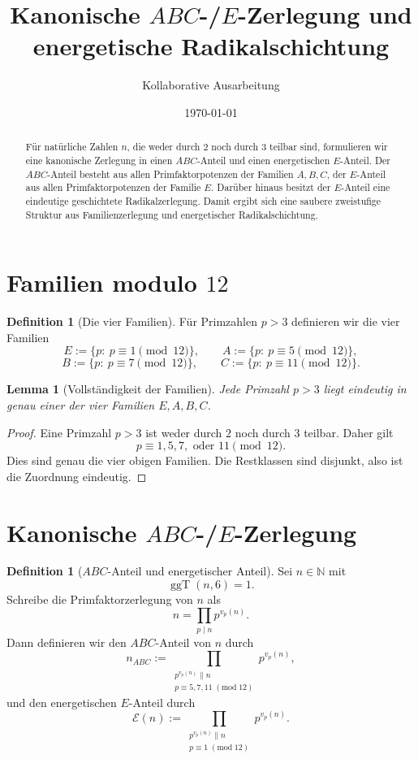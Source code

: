 \documentclass[11pt,a4paper]{article}
\title{Kanonische \(ABC\)-/\(E\)-Zerlegung und energetische Radikalschichtung}
\author{Kollaborative Ausarbeitung}
\date{\today}
\newtheorem{lemma}[satz]{Lemma}
\theoremstyle{definition}
\newtheorem{definition}[satz]{Definition}
\theoremstyle{remark}
\newcommand{\N}{\mathbb{N}}
\newcommand{\ggT}{\operatorname{ggT}}
\newcommand{\vp}{v_p}
\begin{document}
	\maketitle
	
	\begin{abstract}
		Für natürliche Zahlen \(n\), die weder durch \(2\) noch durch \(3\) teilbar sind, formulieren wir
		eine kanonische Zerlegung in einen \(ABC\)-Anteil und einen energetischen \(E\)-Anteil.
		Der \(ABC\)-Anteil besteht aus allen Primfaktorpotenzen der Familien \(A,B,C\), der
		\(E\)-Anteil aus allen Primfaktorpotenzen der Familie \(E\). Darüber hinaus besitzt der
		\(E\)-Anteil eine eindeutige geschichtete Radikalzerlegung. Damit ergibt sich eine saubere
		zweistufige Struktur aus Familienzerlegung und energetischer Radikalschichtung.
	\end{abstract}
	
	\section{Familien modulo \(12\)}
	
	\begin{definition}[Die vier Familien]
		Für Primzahlen \(p>3\) definieren wir die vier Familien
		\[
		E:=\{p:\ p\equiv 1 \pmod{12}\},\qquad
		A:=\{p:\ p\equiv 5 \pmod{12}\},
		\]
		\[
		B:=\{p:\ p\equiv 7 \pmod{12}\},\qquad
		C:=\{p:\ p\equiv 11 \pmod{12}\}.
		\]
	\end{definition}
	
	\begin{lemma}[Vollständigkeit der Familien]
		Jede Primzahl \(p>3\) liegt eindeutig in genau einer der vier Familien \(E,A,B,C\).
	\end{lemma}
	
	\begin{proof}
		Eine Primzahl \(p>3\) ist weder durch \(2\) noch durch \(3\) teilbar. Daher gilt
		\[
		p\equiv 1,5,7,\text{ oder }11 \pmod{12}.
		\]
		Dies sind genau die vier obigen Familien. Die Restklassen sind disjunkt, also ist die Zuordnung eindeutig.
	\end{proof}
	
	\section{Kanonische \(ABC\)-/\(E\)-Zerlegung}
	
	\begin{definition}[\(ABC\)-Anteil und energetischer Anteil]
		Sei \(n\in\N\) mit
		\[
		\ggT(n,6)=1.
		\]
		Schreibe die Primfaktorzerlegung von \(n\) als
		\[
		n=\prod_{p\mid n} p^{\vp(n)}.
		\]
		Dann definieren wir den \(ABC\)-Anteil von \(n\) durch
		\[
		n_{ABC}:=
		\prod_{\substack{p^{\vp(n)}\parallel n\\ p\equiv 5,7,11\;(\mathrm{mod}\;12)}} p^{\vp(n)},
		\]
		und den energetischen \(E\)-Anteil durch
		\[
		\mathcal E(n):=
		\prod_{\substack{p^{\vp(n)}\parallel n\\ p\equiv 1\;(\mathrm{mod}\;12)}} p^{\vp(n)}.
		\]
	\end{definition}
	
\end{document}
